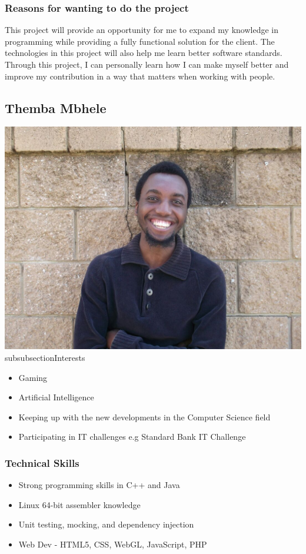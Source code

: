 \documentclass{scrartcl}
\begin{document}
\subsubsection{Reasons for wanting to do the project}
This project will provide an opportunity for me to expand my knowledge in programming while providing a fully functional solution for the client. The technologies in this project will also help me learn better software standards. Through this project, I can personally learn how I can make myself better and improve my contribution in a way that matters when working with people.
\newpage
\subsection{Themba Mbhele}
\includegraphics[width=\textwidth]{images/Themba}
\\subsubsection{Interests}
\begin{itemize}
    \item Gaming
    \item Artificial Intelligence
    \item Keeping up with the new developments in the Computer Science field
    \item Participating in IT challenges e.g Standard Bank IT Challenge
\end{itemize}
\subsubsection{Technical Skills}
\begin{itemize}
    \item Strong programming skills in C++ and Java
    \item Linux 64-bit assembler knowledge
    \item Unit testing, mocking, and dependency injection
    \item Web Dev - HTML5, CSS, WebGL, JavaScript, PHP
\end{itemize}
\end{document}
